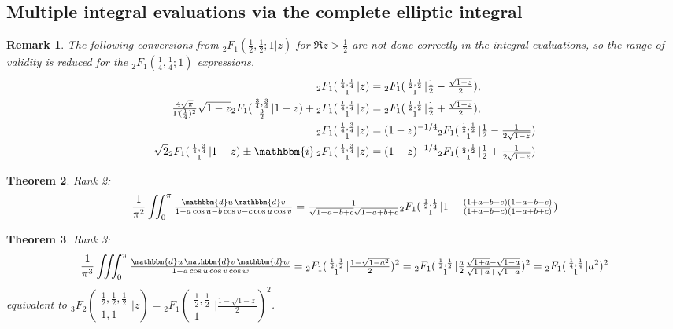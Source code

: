 \documentclass[12pt]{article}
\newcommand{\ii}[0] {\mathbbm{i}}
\newcommand{\dd}[0] {\mathbbm{d}}
\numberwithin{equation}{section}
\newtheorem{theorem}{Theorem}[section]
\newtheorem{remark}[theorem]{Remark}
\newcommand{\Head}[3] {{}_{#1}{#2}_{#3}}
\newcommand{\ArgS}[3] {( \begin{smallmatrix} #1 \\ #2 \end{smallmatrix} | {#3})}
\newcommand{\ArgKS}[1] {\ArgS{\frac12,\frac12}{1}{#1}}
\newcommand{\FFs}[6] {{}_{#1}{#2}_{#3} ( \begin{smallmatrix} #4 \\ #5 \end{smallmatrix} | {#6}  )}
\begin{document}
\subsection{Multiple integral evaluations via the complete elliptic integral}
\begin{remark}
The following conversions from $\Head{2}{F}{1}(\frac12, \frac12; 1 | z)$ for $\Re z > \frac12$ are not done correctly in the integral evaluations, so the range of validity is reduced for the $\Head{2}{F}{1}(\frac14, \frac14; 1)$ expressions.
\begin{align*}
\FFs{2}{F}{1}{\frac14,\frac14}{1}{z} &= \Head{2}{F}{1} \ArgKS{\tfrac12 - \tfrac{\sqrt{1-z}}{2}}\text{,}\\
\tfrac{4\sqrt{\pi}}{\Gamma(\frac14)^2} \sqrt{1-z} \Head{2}{F}{1} \ArgS{\frac34,\frac34}{\frac32}{1-z} + \FFs{2}{F}{1}{\frac14,\frac14}{1}{z} &= \Head{2}{F}{1} \ArgKS{\tfrac12 + \tfrac{\sqrt{1-z}}{2}}\text{,}\\
\FFs{2}{F}{1}{\frac14,\frac34}{1}{z} &= (1-z)^{-1/4}\Head{2}{F}{1} \ArgKS{\tfrac12 - \tfrac{1}{2\sqrt{1-z}}}\\
\sqrt{2} \Head{2}{F}{1} \ArgS{\frac14,\frac34}{1}{1-z} \pm \ii \, \FFs{2}{F}{1}{\frac14,\frac34}{1}{z} &= (1-z)^{-1/4}\Head{2}{F}{1} \ArgKS{\tfrac12 + \tfrac{1}{2\sqrt{1-z}}}
\end{align*}
\end{remark}




\begin{theorem} Rank 2:
\label{thm_double_trig_int}
\begin{equation*}
\frac{1}{\pi^2} \iint_0^{\pi} \tfrac{\dd u \, \dd v} {1 - a \cos u - b \cos v - c \cos u \cos v} = \tfrac{1}{\sqrt{1+a-b+c}\sqrt{1-a+b+c}} \Head{2}{F}{1} \ArgKS{1-\tfrac{(1+a+b-c)(1-a-b-c)}{(1+a-b+c)(1-a+b+c)}}
\end{equation*}
\end{theorem}

\begin{theorem} Rank 3:
\begin{equation*}
\frac{1}{\pi^3} \iiint_0^{\pi} \tfrac{\dd u \, \dd v \, \dd w} {1 - a \cos u \cos v \cos w} = \Head{2}{F}{1} \ArgKS{\tfrac{1-\sqrt{1-a^2}}{2}}^2 = \Head{2}{F}{1} \ArgKS{\tfrac{a}{2}\tfrac{\sqrt{1+a}-\sqrt{1-a}}{\sqrt{1+a}+\sqrt{1-a}}}^2 = \Head{2}{F}{1} \ArgS{\frac14,\frac14}{1}{a^2}^2
\end{equation*}
equivalent to $\FFs{3}{F}{2}{\frac12,\frac12,\frac12}{1,1}{z} = \Head{2}{F}{1} \ArgKS{\tfrac{1 -\sqrt{1-z}}{2}}^2$.
\end{theorem}
\end{document}
